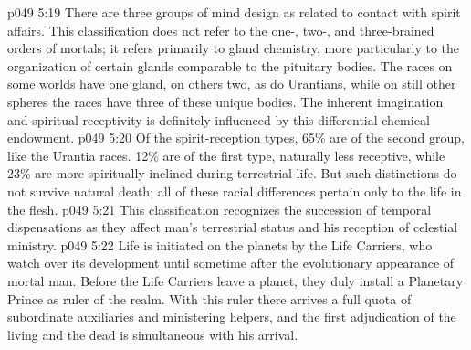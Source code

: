 \vs p049 5:19 \bibnobreakspace {} There are three groups of mind design as related to contact with spirit affairs. This classification does not refer to the one-, two-, and three\hyp{}brained orders of mortals; it refers primarily to gland chemistry, more particularly to the organization of certain glands comparable to the pituitary bodies. The races on some worlds have one gland, on others two, as do Urantians, while on still other spheres the races have three of these unique bodies. The inherent imagination and spiritual receptivity is definitely influenced by this differential chemical endowment.
\vs p049 5:20 Of the spirit\hyp{}reception types, 65\% are of the second group, like the Urantia races. 12\% are of the first type, naturally less receptive, while 23\% are more spiritually inclined during terrestrial life. But such distinctions do not survive natural death; all of these racial differences pertain only to the life in the flesh.
\vs p049 5:21 \bibnobreakspace {} This classification recognizes the succession of temporal dispensations as they affect man’s terrestrial status and his reception of celestial ministry.
\vs p049 5:22 Life is initiated on the planets by the Life Carriers, who watch over its development until sometime after the evolutionary appearance of mortal man. Before the Life Carriers leave a planet, they duly install a Planetary Prince as ruler of the realm. With this ruler there arrives a full quota of subordinate auxiliaries and ministering helpers, and the first adjudication of the living and the dead is simultaneous with his arrival.
